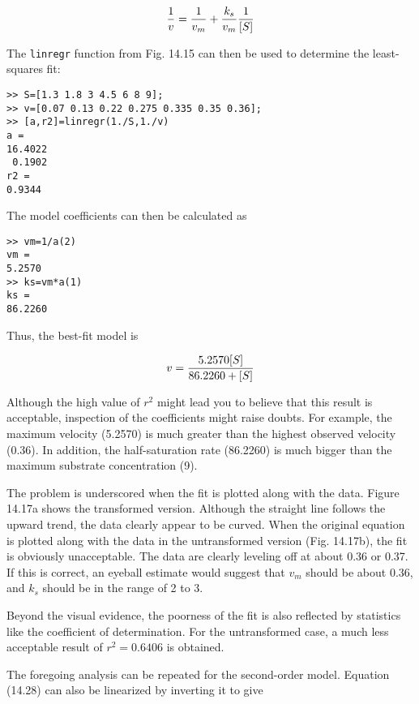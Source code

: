 \documentclass[../main.tex]{subfiles}
\begin{document}
\begin{equation}
	\notag
	\frac{1}{v} = \frac{1}{v_m} + \frac{k_s}{v_m} \frac{1}{[S]}
\end{equation}

\noindent The \texttt{linregr} function from Fig. 14.15 can then be used to determine the least-squares fit:

\begin{lstlisting}[numbers=none] 
>> S=[1.3 1.8 3 4.5 6 8 9];
>> v=[0.07 0.13 0.22 0.275 0.335 0.35 0.36];
>> [a,r2]=linregr(1./S,1./v)
a =
16.4022
 0.1902
r2 =
0.9344
\end{lstlisting}

\noindent The model coefficients can then be calculated as

\begin{lstlisting}[numbers=none] 
>> vm=1/a(2)
vm =
5.2570
>> ks=vm*a(1)
ks =
86.2260
\end{lstlisting}

\noindent Thus, the best-fit model is

\begin{equation}
	\notag
	v = \frac{5.2570[S]}{86.2260 + [S]}
\end{equation}

Although the high value of $r^2$ might lead you to believe that this result is acceptable, inspection of the coefficients might raise doubts. For example, the maximum velocity (5.2570) is much greater than the highest observed velocity (0.36). In addition, the half-saturation rate (86.2260) is much bigger than the maximum substrate concentration (9).

The problem is underscored when the fit is plotted along with the data. Figure 14.17a shows the transformed version. Although the straight line follows the upward trend, the data clearly appear to be curved. When the original equation is plotted along with the data in the untransformed version (Fig. 14.17b), the fit is obviously unacceptable. The data are clearly leveling off at about 0.36 or 0.37. If this is correct, an eyeball estimate would suggest that $v_m$ should be about 0.36, and $k_s$ should be in the range of 2 to 3.

Beyond the visual evidence, the poorness of the fit is also reflected by statistics like the coefficient of determination. For the untransformed case, a much less acceptable result of $r^2 = 0.6406$ is obtained.


The foregoing analysis can be repeated for the second-order model. Equation (14.28) can also be linearized by inverting it to give
\end{document}

